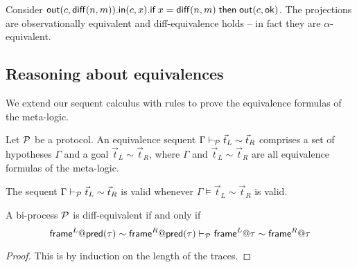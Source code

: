 \begin{example} \label{ex:problem}
  Consider $\mathsf{out}(c,\mathsf{diff}(n,m)).
  \mathsf{in}(c,x).
  \textsf{if}\; x=\mathsf{diff}(n,m) \;\textsf{then}\; \mathsf{out}(c,\mathsf{ok})$.
  The projections are observationally equivalent and diff-equivalence
  holds -- in fact they are $\alpha$-equivalent.
\end{example}


\subsection{Reasoning about equivalences}

We extend our sequent calculus with rules to prove the equivalence formulas of the meta-logic.

\begin{definition}
  Let $\mathcal{P}$ be a protocol. An equivalence sequent $\Gamma \vdash_{\mathcal{P}} \vec{t}_L \sim \vec{t}_R$ comprises a set of hypotheses $\Gamma$ and a goal $\vec{t}_L \sim \vec{t}_R$, where $\Gamma$ and $\vec{t}_L \sim \vec{t}_R$ are all equivalence formulas of the meta-logic.

  The sequent  $\Gamma \vdash_{\mathcal{P}} \vec{t}_L \sim \vec{t}_R$ is valid whenever $\Gamma \models \vec{t}_L \sim \vec{t}_R$ is valid.
\end{definition}

\begin{lemma}
  A bi-process $\mathcal{P}$ is diff-equivalent if and only if
  \[
    \textsf{frame}^L@\textsf{pred}(\tau) \sim \textsf{frame}^R@\textsf{pred}(\tau)
    \vdash_{\mathcal{P}}
    \textsf{frame}^L@\tau \sim \textsf{frame}^R@\tau
  \]
\end{lemma}
\begin{proof}
  This is by induction on the length of the traces.
\end{proof}


